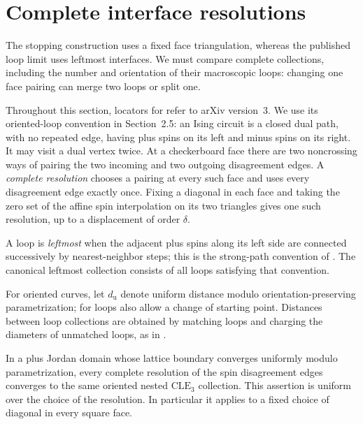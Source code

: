 \section{Complete interface resolutions}\label{re:section}

The stopping construction uses a fixed face triangulation, whereas the
published loop limit uses leftmost interfaces. We must compare complete
collections, including the number and orientation of their macroscopic
loops: changing one face pairing can merge two loops or split one.

Throughout this section, locators for \cite{BH2019} refer to
arXiv version~3. We use its oriented-loop convention in Section~2.5: an
Ising circuit is a closed dual path, with no repeated edge, having plus
spins on its left and minus spins on its right.  It may visit a dual
vertex twice.  At a checkerboard face there are two noncrossing ways of
pairing the two incoming and two outgoing disagreement edges.  A
\emph{complete resolution} chooses a pairing at every such face and
uses every disagreement edge exactly once. Fixing a diagonal in each
face and taking the zero set of the affine spin interpolation on its
two triangles gives one such resolution, up to a displacement of order
$\delta$.

A loop is \emph{leftmost} when the adjacent plus spins along its left
side are connected successively by nearest-neighbor steps; this is the
strong-path convention of \cite[Section~2.5]{BH2019}. The canonical
leftmost collection consists of all loops satisfying that convention.

For oriented curves, let $d_{\mathrm{u}}$ denote uniform distance modulo
orientation-preserving parametrization; for loops also allow a change
of starting point.  Distances between loop collections are obtained by
matching loops and charging the diameters of unmatched loops, as in
\cite[Section~2.7]{BH2019}.

\begin{lemma}
\label{if:resolution-convergence}
In a plus Jordan domain whose lattice boundary converges uniformly
modulo parametrization, every complete resolution of the spin
disagreement edges converges to the same oriented nested
$\mathrm{CLE}_3$ collection.  This assertion is uniform over the choice
of the resolution.  In particular it applies to a fixed choice of
diagonal in every square face.
\end{lemma}

